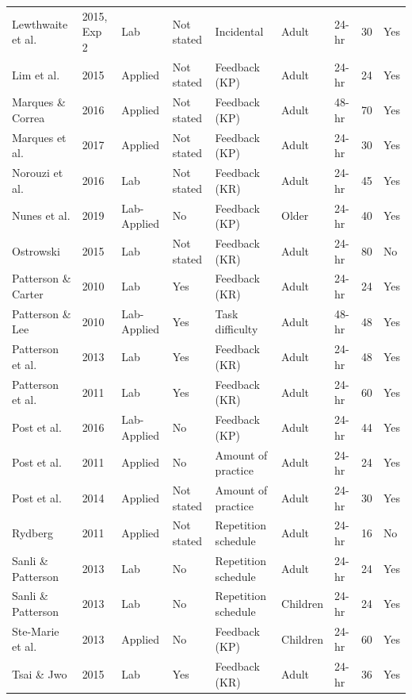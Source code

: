 \documentclass[
  english,
  man, donotrepeattitle,floatsintext]{apa7}
\begin{document}
\begin{landscape}
\begin{ThreePartTable}
\begin{longtable}[l]{lllllllrl}
\addlinespace
Lewthwaite et al. & 2015, Exp 2 & Lab & Not stated & Incidental & Adult & 24-hr & 30 & Yes\\
\addlinespace
Lim et al. & 2015 & Applied & Not stated & Feedback (KP) & Adult & 24-hr & 24 & Yes\\
\addlinespace
Marques \& Correa & 2016 & Applied & Not stated & Feedback (KP) & Adult & 48-hr & 70 & Yes\\
\addlinespace
Marques et al. & 2017 & Applied & Not stated & Feedback (KP) & Adult & 24-hr & 30 & Yes\\
\addlinespace
Norouzi et al. & 2016 & Lab & Not stated & Feedback (KR) & Adult & 24-hr & 45 & Yes\\
\addlinespace
Nunes et al. & 2019 & Lab-Applied & No & Feedback (KP) & Older & 24-hr & 40 & Yes\\
\addlinespace
Ostrowski & 2015 & Lab & Not stated & Feedback (KR) & Adult & 24-hr & 80 & No\\
\addlinespace
Patterson \& Carter & 2010 & Lab & Yes & Feedback (KR) & Adult & 24-hr & 24 & Yes\\
\addlinespace
Patterson \& Lee & 2010 & Lab-Applied & Yes & Task difficulty & Adult & 48-hr & 48 & Yes\\
\addlinespace
Patterson et al. & 2013 & Lab & Yes & Feedback (KR) & Adult & 24-hr & 48 & Yes\\
\addlinespace
Patterson et al. & 2011 & Lab & Yes & Feedback (KR) & Adult & 24-hr & 60 & Yes\\
\addlinespace
Post et al. & 2016 & Lab-Applied & No & Feedback (KP) & Adult & 24-hr & 44 & Yes\\
\addlinespace
Post et al. & 2011 & Applied & No & Amount of practice & Adult & 24-hr & 24 & Yes\\
\addlinespace
Post et al. & 2014 & Applied & Not stated & Amount of practice & Adult & 24-hr & 30 & Yes\\
\addlinespace
Rydberg & 2011 & Applied & Not stated & Repetition schedule & Adult & 24-hr & 16 & No\\
\addlinespace
Sanli \& Patterson & 2013 & Lab & No & Repetition schedule & Adult & 24-hr & 24 & Yes\\
\addlinespace
Sanli \& Patterson & 2013 & Lab & No & Repetition schedule & Children & 24-hr & 24 & Yes\\
\addlinespace
Ste-Marie et al. & 2013 & Applied & No & Feedback (KP) & Children & 24-hr & 60 & Yes\\
\addlinespace
Tsai \& Jwo & 2015 & Lab & Yes & Feedback (KR) & Adult & 24-hr & 36 & Yes\\

\end{longtable}
\end{ThreePartTable}
\end{landscape}
\end{document}
